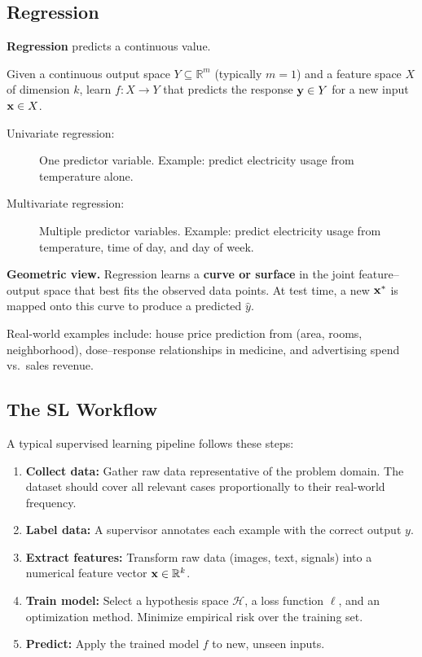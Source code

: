 \subsection*{Regression}

\textbf{Regression} predicts a continuous value.

\begin{definition}[Regression]
Given a continuous output space $Y \subseteq \mathbb{R}^m$ (typically $m=1$) and a feature space $X$ of dimension $k$, learn $f: X \to Y$ that predicts the response $\mathbf{y} \in Y$ for a new input $\mathbf{x} \in X$.
\end{definition}

\begin{description}
    \item[Univariate regression:] One predictor variable.
        Example: predict electricity usage from temperature alone.
    \item[Multivariate regression:] Multiple predictor variables.
        Example: predict electricity usage from temperature, time of day, and day of week.
\end{description}

\textbf{Geometric view.}
Regression learns a \textbf{curve or surface} in the joint feature--output space that best fits the observed data points.
At test time, a new $\mathbf{x}^*$ is mapped onto this curve to produce a predicted $\hat{y}$.

Real-world examples include: house price prediction from (area, rooms, neighborhood), dose--response relationships in medicine, and advertising spend vs.\ sales revenue.

\subsection*{The SL Workflow}

A typical supervised learning pipeline follows these steps:

\begin{enumerate}
    \item \textbf{Collect data:} Gather raw data representative of the problem domain. The dataset should cover all relevant cases proportionally to their real-world frequency.
    \item \textbf{Label data:} A supervisor annotates each example with the correct output $y$.
    \item \textbf{Extract features:} Transform raw data (images, text, signals) into a numerical feature vector $\mathbf{x} \in \mathbb{R}^k$.
    \item \textbf{Train model:} Select a hypothesis space $\mathcal{H}$, a loss function $\ell$, and an optimization method. Minimize empirical risk over the training set.
    \item \textbf{Predict:} Apply the trained model $f$ to new, unseen inputs.
\end{enumerate}


